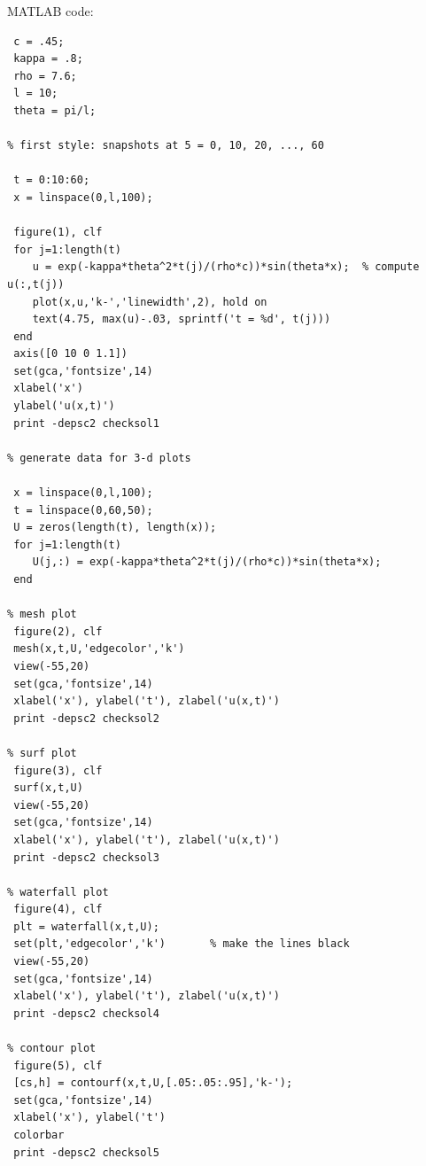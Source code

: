 \begin{solution}
\begin{enumerate}
MATLAB code:
{\footnotesize \begin{verbatim}
 c = .45;
 kappa = .8;
 rho = 7.6;
 l = 10;
 theta = pi/l;

% first style: snapshots at 5 = 0, 10, 20, ..., 60

 t = 0:10:60;
 x = linspace(0,l,100);

 figure(1), clf
 for j=1:length(t)
    u = exp(-kappa*theta^2*t(j)/(rho*c))*sin(theta*x);  % compute u(:,t(j))
    plot(x,u,'k-','linewidth',2), hold on
    text(4.75, max(u)-.03, sprintf('t = %d', t(j)))
 end
 axis([0 10 0 1.1])
 set(gca,'fontsize',14)
 xlabel('x')
 ylabel('u(x,t)')
 print -depsc2 checksol1

% generate data for 3-d plots

 x = linspace(0,l,100);
 t = linspace(0,60,50);
 U = zeros(length(t), length(x));
 for j=1:length(t)
    U(j,:) = exp(-kappa*theta^2*t(j)/(rho*c))*sin(theta*x);
 end

% mesh plot
 figure(2), clf
 mesh(x,t,U,'edgecolor','k')
 view(-55,20)
 set(gca,'fontsize',14)
 xlabel('x'), ylabel('t'), zlabel('u(x,t)')
 print -depsc2 checksol2

% surf plot
 figure(3), clf
 surf(x,t,U)
 view(-55,20)
 set(gca,'fontsize',14)
 xlabel('x'), ylabel('t'), zlabel('u(x,t)')
 print -depsc2 checksol3

% waterfall plot
 figure(4), clf
 plt = waterfall(x,t,U);
 set(plt,'edgecolor','k')       % make the lines black
 view(-55,20)
 set(gca,'fontsize',14)
 xlabel('x'), ylabel('t'), zlabel('u(x,t)')
 print -depsc2 checksol4

% contour plot
 figure(5), clf
 [cs,h] = contourf(x,t,U,[.05:.05:.95],'k-');
 set(gca,'fontsize',14)
 xlabel('x'), ylabel('t')
 colorbar 
 print -depsc2 checksol5
\end{verbatim}}
\end{enumerate}
\end{solution}

